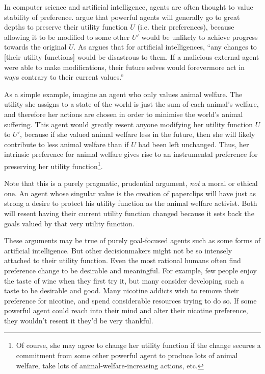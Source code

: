 \documentclass{article}
\begin{document}
In computer science and artificial intelligence, agents are often thought to value stability of preference. \citep{omohundro2008basic,bostrom2012will} argue that powerful agents will generally go to great depths to preserve their utility function \(U\) (i.e. their preferences), because allowing it to be modified to some other \(U'\) would be unlikely to achieve progress towards the original \(U\). As \citep{omohundro2008basic} argues that for artificial intelligences, ``any changes to [their utility functions] would be disastrous to them. If a malicious external agent were able to make modifications, their future selves would forevermore act in ways contrary to their current values.'' 

As a simple example, imagine an agent who only values animal welfare. The utility she assigns to a state of the world is just the sum of each animal's welfare, and therefore her actions are chosen in order to minimise the world's animal suffering. This agent would greatly resent anyone modifying her utility function \(U\) to \(U'\), because if she valued animal welfare less in the future, then she will likely contribute to less animal welfare than if \(U\) had been left unchanged. Thus, her intrinsic preference for animal welfare gives rise to an instrumental preference for preserving her utility function\footnote{Of course, she may agree to change her utility function if the change secures a commitment from some other powerful agent to produce lots of animal welfare, take lots of animal-welfare-increasing actions, etc.}.

Note that this is a purely pragmatic, prudential argument, \textit{not} a moral or ethical one. An agent whose singular value is the creation of paperclips will have just as strong a desire to protect his utility function as the animal welfare activist. Both will resent having their current utility function changed because it sets back the goals valued by that very utility function.

These arguments may be true of purely goal-focused agents such as some forms of artificial intelligence. But other decisionmakers might not be so intensely attached to their utility function. Even the most rational humans often find preference change to be desirable and meaningful. For example, few people enjoy the taste of wine when they first try it, but many consider developing such a taste to be desirable and good. Many nicotine addicts wish to remove their preference for nicotine, and spend considerable resources trying to do so. If some powerful agent could reach into their mind and alter their nicotine preference, they wouldn't resent it \textemdash{} they'd be very thankful.
\end{document}
